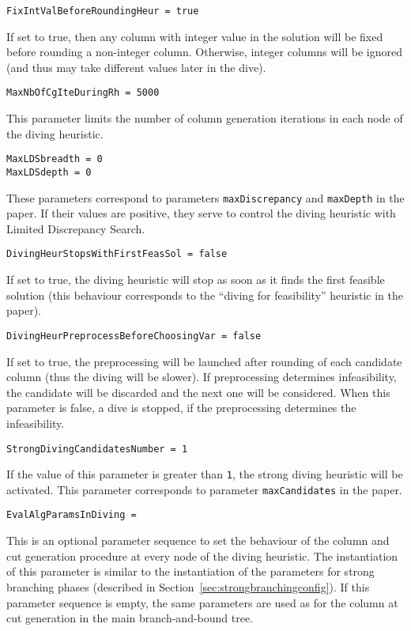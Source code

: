 \documentclass[10pt,a4paper]{article}
\begin{document}
\begin{lstlisting}
FixIntValBeforeRoundingHeur = true
\end{lstlisting}
If set to true, then any column with integer value in the solution will be fixed before rounding a non-integer
column. Otherwise, integer columns will be ignored (and thus may take different values later in the dive).

\begin{lstlisting}
MaxNbOfCgIteDuringRh = 5000
\end{lstlisting}
This parameter limits the number of column generation iterations in each node of the diving heuristic.

\begin{lstlisting}
MaxLDSbreadth = 0
MaxLDSdepth = 0
\end{lstlisting}
These parameters correspond to parameters \verb+maxDiscrepancy+ and \verb+maxDepth+ in the paper. If their values are
positive, they serve to control the diving heuristic with Limited Discrepancy Search.

\begin{lstlisting}
DivingHeurStopsWithFirstFeasSol = false
\end{lstlisting}
If set to true, the diving heuristic will stop as soon as it finds the first feasible solution (this behaviour
corresponds to the ``diving for feasibility'' heuristic in the paper).

\begin{lstlisting}
DivingHeurPreprocessBeforeChoosingVar = false
\end{lstlisting}
If set to true, the preprocessing will be launched after rounding of each candidate column (thus the diving will be
slower). If preprocessing determines infeasibility, the candidate will be discarded and the next one will be
considered. When this parameter is false, a dive is stopped, if the preprocessing determines the infeasibility.

\begin{lstlisting}
StrongDivingCandidatesNumber = 1
\end{lstlisting}
If the value of this parameter is greater than \verb+1+, the strong diving heuristic will be activated. This parameter corresponds to
parameter \verb+maxCandidates+ in the paper.

\begin{lstlisting}
EvalAlgParamsInDiving = 
\end{lstlisting}
This is an optional parameter sequence to set the behaviour of the column and cut generation procedure at every node of
the diving heuristic. The instantiation of this parameter is similar to the instantiation of the parameters for strong
branching phases (described in Section~\ref{sec:strongbranchingconfig}). If this parameter sequence is empty, the same
parameters are used as for the column at cut generation in the main branch-and-bound tree.
\end{document}
